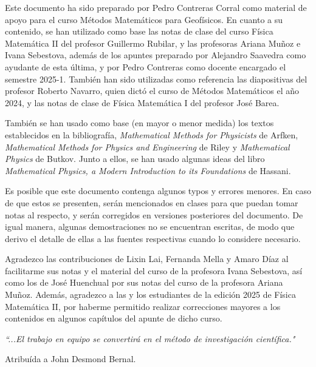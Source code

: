 \documentclass[letterpaper,12pt, twoside]{book}
\theoremstyle{definition}
\begin{document}
Este documento ha sido preparado por Pedro Contreras Corral como material de apoyo para el curso Métodos Matemáticos para Geofísicos. En cuanto a su contenido, se han utilizado como base las notas de clase del curso Física Matemática II del profesor Guillermo Rubilar, y las profesoras Ariana Muñoz e Ivana Sebestova, además de los apuntes preparado por Alejandro Saavedra como ayudante de esta última, y por Pedro Contreras como docente encargado el semestre 2025-1. También han sido utilizadas como referencia las diapositivas del profesor Roberto Navarro, quien dictó el curso de Métodos Matemáticos el año 2024, y las notas de clase de Física Matemática I del profesor José Barea.

También se han usado como base (en mayor o menor medida) los textos establecidos en la bibliografía, \emph{Mathematical Methods for Physicists} de Arfken, \emph{Mathematical Methods for Physics and Engineering} de Riley y \emph{Mathematical Physics} de Butkov. Junto a ellos, se han usado algunas ideas del libro \emph{Mathematical Physics, a Modern Introduction to its Foundations} de Hassani.

Es posible que este documento contenga algunos typos y errores menores. En caso de que estos se presenten, serán mencionados en clases para que puedan tomar notas al respecto, y serán corregidos en versiones posteriores del documento. De igual manera, algunas demostraciones no se encuentran escritas, de modo que derivo el detalle de ellas a las fuentes respectivas cuando lo considere necesario.

Agradezco las contribuciones de Lixin Lai, Fernanda Mella y Amaro Díaz al facilitarme sus notas y el material del curso de la profesora Ivana Sebestova, así como los de José Huenchual por sus notas del curso de la profesora Ariana Muñoz. Además, agradezco a las y los estudiantes de la edición 2025 de Física Matemática II, por haberme permitido realizar correcciones mayores a los contenidos en algunos capítulos del apunte de dicho curso.

\newpage

\vspace*{10cm}

\vfill

\emph{\textquotedblleft ...El trabajo en equipo se convertirá en el método de investigación científica."}

\begin{flushright}
Atribuída a John Desmond Bernal.
\end{flushright}
\end{document}
